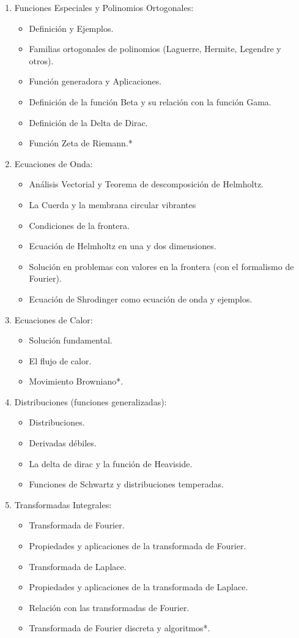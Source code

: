 \documentclass[letterpaper]{article}
\begin{document}
\begin{enumerate}
\item Funciones Especiales y Polinomios Ortogonales:
\begin{itemize}
\item Definición y Ejemplos.
\item Familias ortogonales de polinomios (Laguerre, Hermite, Legendre y otros).
\item Función generadora y Aplicaciones.
\item Definición de la función Beta y su relación con la función Gama.
\item Definición de la Delta de Dirac.
\item Función Zeta de Riemann.*
\end{itemize}

\item Ecuaciones de Onda:
\begin{itemize}
\item Análisis Vectorial y Teorema de descomposición de Helmholtz.
\item La Cuerda y la membrana circular vibrantes
\item Condiciones de la frontera.
\item Ecuación de Helmholtz en una y dos dimensiones.
\item Solución en problemas con valores en la frontera (con el formalismo de Fourier).
\item Ecuación de Shrodinger como ecuación de onda y ejemplos.
\end{itemize}

\item Ecuaciones de Calor:
\begin{itemize}
\item Solución fundamental.
\item El flujo de calor.
\item Movimiento Browniano*.
\end{itemize}

\item Distribuciones (funciones generalizadas):
\begin{itemize}
\item Distribuciones.
\item Derivadas débiles.
\item La delta de dirac y la función de Heaviside.
\item Funciones de Schwartz y distribuciones temperadas.
\end{itemize}

\item Transformadas Integrales:
\begin{itemize}
\item Transformada de Fourier.
\item Propiedades y aplicaciones de la transformada de Fourier.
\item Transformada de Laplace.
\item Propiedades y aplicaciones de la transformada de Laplace.
\item Relación con las transformadas de Fourier.
\item Transformada de Fourier discreta y algoritmos*.
\end{itemize}


\end{enumerate}
\end{document}
